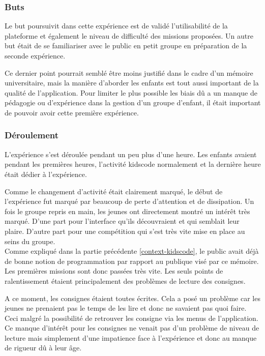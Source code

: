 \subsubsection{Buts}
Le but poursuivit dans cette expérience est de validé l'utilisabilité de la plateforme et également le niveau de difficulté des missions proposées. Un autre but était de se familiariser avec le public en petit groupe en préparation de la seconde expérience.

Ce dernier point pourrait semblé être moins justifié dans le cadre d'un mémoire universitaire, mais la manière d'aborder les enfants est tout aussi important de la qualité de l'application. Pour limiter le plus possible les biais dû a un manque de pédagogie ou d'expérience dans la gestion d'un groupe d'enfant, il était important de pouvoir avoir cette première expérience.
\subsubsection{Déroulement}
L'expérience s'est déroulée pendant un peu plus d'une heure. Les enfants avaient pendant les premières heures, l'activité kidscode normalement et la dernière heure était dédier à l'expérience. 

Comme le changement d'activité était clairement marqué, le début de l'expérience fut marqué par beaucoup de perte d'attention et de dissipation. Un fois le groupe repris en main, les jeunes ont directement montré un intérêt très marqué. D'une part pour l'interface qu'ils découvraient et qui semblait leur plaire. D'autre part pour une compétition qui s'est très vite mise en place au seins du groupe.\\

Comme expliqué dans la partie précédente \ref{context-kidscode}, le public avait déjà de bonne notion de programmation par rapport au publique visé par ce mémoire. Les premières missions sont donc passées très vite. Les seuls points de ralentissement étaient principalement des problèmes de lecture des consignes. 

A ce moment, les consignes étaient toutes écrites. Cela a posé un problème car les jeunes ne prenaient pas le temps de les lire et donc ne savaient pas quoi faire. Ceci malgré la possibilité de retrouver les consigne via les menus de l'application. Ce manque d'intérêt pour les consignes ne venait pas d'un problème de niveau de lecture mais simplement d'une impatience face à l'expérience et donc au manque de rigueur dû à leur âge.\\

